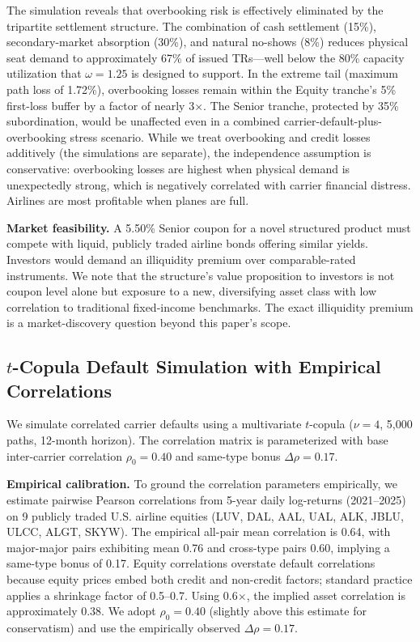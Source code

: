 \documentclass[12pt,a4paper]{article}
\begin{document}
The simulation reveals that overbooking risk is effectively eliminated by the tripartite settlement structure. The combination of cash settlement (15\%), secondary-market absorption (30\%), and natural no-shows (8\%) reduces physical seat demand to approximately 67\% of issued TRs---well below the 80\% capacity utilization that $\omega = 1.25$ is designed to support. In the extreme tail (maximum path loss of 1.72\%), overbooking losses remain within the Equity tranche's 5\% first-loss buffer by a factor of nearly 3$\times$. The Senior tranche, protected by 35\% subordination, would be unaffected even in a combined carrier-default-plus-overbooking stress scenario. While we treat overbooking and credit losses additively (the simulations are separate), the independence assumption is conservative: overbooking losses are highest when physical demand is unexpectedly strong, which is negatively correlated with carrier financial distress. Airlines are most profitable when planes are full.

\textbf{Market feasibility.} A 5.50\% Senior coupon for a novel structured product must compete with liquid, publicly traded airline bonds offering similar yields. Investors would demand an illiquidity premium over comparable-rated instruments. We note that the structure's value proposition to investors is not coupon level alone but exposure to a new, diversifying asset class with low correlation to traditional fixed-income benchmarks. The exact illiquidity premium is a market-discovery question beyond this paper's scope.

\subsection{\texorpdfstring{$t$}{t}-Copula Default Simulation with Empirical Correlations}

We simulate correlated carrier defaults using a multivariate $t$-copula ($\nu = 4$, 5,000 paths, 12-month horizon). The correlation matrix is parameterized with base inter-carrier correlation $\rho_0 = 0.40$ and same-type bonus $\Delta\rho = 0.17$.

\textbf{Empirical calibration.} To ground the correlation parameters empirically, we estimate pairwise Pearson correlations from 5-year daily log-returns (2021--2025) on 9 publicly traded U.S. airline equities (LUV, DAL, AAL, UAL, ALK, JBLU, ULCC, ALGT, SKYW). The empirical all-pair mean correlation is 0.64, with major-major pairs exhibiting mean 0.76 and cross-type pairs 0.60, implying a same-type bonus of 0.17. Equity correlations overstate default correlations because equity prices embed both credit and non-credit factors; standard practice applies a shrinkage factor of 0.5--0.7. Using 0.6$\times$, the implied asset correlation is approximately 0.38. We adopt $\rho_0 = 0.40$ (slightly above this estimate for conservatism) and use the empirically observed $\Delta\rho = 0.17$.
\end{document}
